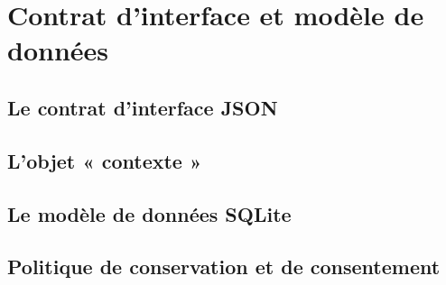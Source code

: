 
\section{Contrat d'interface et modèle de données}


\subsection{Le contrat d'interface JSON}

\subsection{L'objet « contexte »}

\subsection{Le modèle de données SQLite}

\subsection{Politique de conservation et de consentement}
